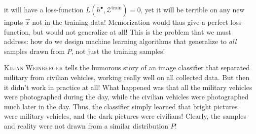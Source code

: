 \documentclass{article}
\begin{document}
it will have a loss-function $L(h^\bullet,\mathcal{Z}^\text{train})=0$, yet it will be terrible on any new inputs $\vec{x}$ not in the training data! Memorization would thus give a perfect loss function, but would not generalize at all! This is the problem that we must address: how do we design machine learning algorithms that generalize to \textit{all} samples drawn from $P$, not just the training samples!
\begin{testexample}
        \textsc{Kilian Weinberger} tells the humorous story of an image classifier that separated military from civilian vehicles, working really well on all collected data. But then it didn't work in practice at all! What happened was that all the military vehicles were photographed during the day, while the civilian vehicles were photographed much later in the day. Thus, the classifier simply learned that bright pictures were military vehicles, and the dark pictures were civilians! Clearly, the samples and reality were not drawn from a similar distribution $P$!
\end{testexample}
\end{document}

